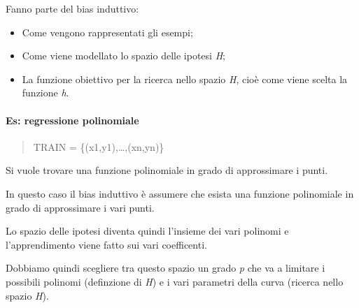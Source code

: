 Fanno parte del bias induttivo:

\begin{itemize}
\tightlist
\item
  Come vengono rappresentati gli esempi;
\item
  Come viene modellato lo spazio delle ipotesi \emph{H};
\item
  La funzione obiettivo per la ricerca nello spazio \emph{H}, cioè come
  viene scelta la funzione \emph{h}.
\end{itemize}

\paragraph{Es: regressione
polinomiale}\label{es-regressione-polinomiale}

\begin{quote}
TRAIN = \{(x1,y1),\ldots{},(xn,yn)\}
\end{quote}

Si vuole trovare una funzione polinomiale in grado di approssimare i
punti.

In questo caso il bias induttivo è assumere che esista una funzione
polinomiale in grado di approssimare i vari punti.

Lo spazio delle ipotesi diventa quindi l'insieme dei vari polinomi e
l'apprendimento viene fatto sui vari coefficenti.

Dobbiamo quindi scegliere tra questo spazio un grado \emph{p} che va a
limitare i possibili polinomi (definzione di \emph{H}) e i vari
parametri della curva (ricerca nello spazio \emph{H}).
